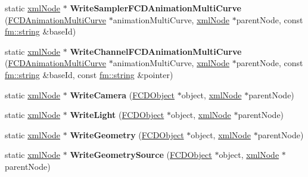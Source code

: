 \begin{DoxyCompactItemize}
\item 
\hypertarget{classFArchiveXML_ab7d6348f3670dede6b5d4c74b624bf3a}{
static \hyperlink{struct__xmlNode}{xmlNode} $\ast$ {\bfseries WriteSamplerFCDAnimationMultiCurve} (\hyperlink{classFCDAnimationMultiCurve}{FCDAnimationMultiCurve} $\ast$animationMultiCurve, \hyperlink{struct__xmlNode}{xmlNode} $\ast$parentNode, const \hyperlink{classfm_1_1stringT}{fm::string} \&baseId)}
\label{classFArchiveXML_ab7d6348f3670dede6b5d4c74b624bf3a}

\item 
\hypertarget{classFArchiveXML_a8b0242d4d276202465dfdb0711e16597}{
static \hyperlink{struct__xmlNode}{xmlNode} $\ast$ {\bfseries WriteChannelFCDAnimationMultiCurve} (\hyperlink{classFCDAnimationMultiCurve}{FCDAnimationMultiCurve} $\ast$animationMultiCurve, \hyperlink{struct__xmlNode}{xmlNode} $\ast$parentNode, const \hyperlink{classfm_1_1stringT}{fm::string} \&baseId, const \hyperlink{classfm_1_1stringT}{fm::string} \&pointer)}
\label{classFArchiveXML_a8b0242d4d276202465dfdb0711e16597}

\item 
\hypertarget{classFArchiveXML_aa9ab0dfc88b8f3938f574a727ce0acbc}{
static \hyperlink{struct__xmlNode}{xmlNode} $\ast$ {\bfseries WriteCamera} (\hyperlink{classFCDObject}{FCDObject} $\ast$object, \hyperlink{struct__xmlNode}{xmlNode} $\ast$parentNode)}
\label{classFArchiveXML_aa9ab0dfc88b8f3938f574a727ce0acbc}

\item 
\hypertarget{classFArchiveXML_abab21e81e57c7aee216bdcb53aad0ff5}{
static \hyperlink{struct__xmlNode}{xmlNode} $\ast$ {\bfseries WriteLight} (\hyperlink{classFCDObject}{FCDObject} $\ast$object, \hyperlink{struct__xmlNode}{xmlNode} $\ast$parentNode)}
\label{classFArchiveXML_abab21e81e57c7aee216bdcb53aad0ff5}

\item 
\hypertarget{classFArchiveXML_a5a5ee34dcc46b42be50c9465e40578b7}{
static \hyperlink{struct__xmlNode}{xmlNode} $\ast$ {\bfseries WriteGeometry} (\hyperlink{classFCDObject}{FCDObject} $\ast$object, \hyperlink{struct__xmlNode}{xmlNode} $\ast$parentNode)}
\label{classFArchiveXML_a5a5ee34dcc46b42be50c9465e40578b7}

\item 
\hypertarget{classFArchiveXML_a1e0c8374002209abf26706968992011e}{
static \hyperlink{struct__xmlNode}{xmlNode} $\ast$ {\bfseries WriteGeometrySource} (\hyperlink{classFCDObject}{FCDObject} $\ast$object, \hyperlink{struct__xmlNode}{xmlNode} $\ast$parentNode)}
\label{classFArchiveXML_a1e0c8374002209abf26706968992011e}


\end{DoxyCompactItemize}
